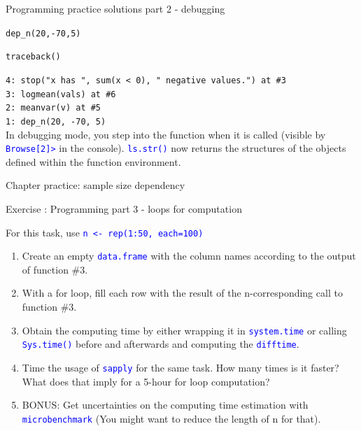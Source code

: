 \documentclass[xcolor=table,       handout,    xcolor=dvipsnames]{beamer}\usepackage[]{graphicx}\usepackage[]{color}
\makeatletter
\newcommand{\hlnum}[1]{\textcolor[rgb]{0,0,0}{#1}}
\newcommand{\hlopt}[1]{\textcolor[rgb]{0,0,0}{#1}}
\newcommand{\hlstd}[1]{\textcolor[rgb]{0,0,0}{#1}}
\newcommand{\hlkwd}[1]{\textcolor[rgb]{0,0,1}{#1}}
\newenvironment{kframe}{%
 \def\at@end@of@kframe{}%
 \ifinner\ifhmode%
  \def\at@end@of@kframe{\end{minipage}}%
  \begin{minipage}{\columnwidth}%
 \fi\fi%
 \def\FrameCommand##1{\hskip\@totalleftmargin \hskip-\fboxsep
 \colorbox{shadecolor}{##1}\hskip-\fboxsep
     \hskip-\linewidth \hskip-\@totalleftmargin \hskip\columnwidth}%
 \MakeFramed {\advance\hsize-\width
   \@totalleftmargin\z@ \linewidth\hsize
   \@setminipage}}%
 {\par\unskip\endMakeFramed%
 \at@end@of@kframe}
\newenvironment{knitrout}{}{} %
\newcounter{exercisecount}
\newenvironment{exercise}[1]
{%
\stepcounter{exercisecount}
\begin{block}{Exercise \arabic{exercisecount}: #1}
}
{%
\end{block} }
\newcommand{\rcode}[1]{\texttt{\textcolor{Blue}{#1}}} %
\makeatother
\begin{document}
\begin{frame}[fragile]{Programming practice solutions part 2 - debugging}
\begin{knitrout}
\color{fgcolor}\begin{kframe}
\begin{alltt}
\hlkwd{dep_n}\hlstd{(}\hlnum{20}\hlstd{,} \hlopt{-}\hlnum{70}\hlstd{,}\hlnum{5}\hlstd{)}
\end{alltt}


{\ttfamily\noindent\bfseries\color{errorcolor}{\#\# Error in logmean(vals): x has 20 negative values.}}\end{kframe}
\end{knitrout}
\begin{knitrout}
\color{fgcolor}\begin{kframe}
\begin{alltt}
\hlkwd{traceback}\hlstd{()}
\end{alltt}
\end{kframe}
\end{knitrout}
\texttt{4: stop("x has ", sum(x < 0), " negative values.") at \#3\\
3: logmean(vals) at \#6\\
2: meanvar(v) at \#5\\
1: dep\_n(20, -70, 5)}\\[1em]
In debugging mode, you step into the function when it is called (visible by \rcode{Browse[2]>} in the console). \rcode{ls.str()} now returns the structures of the objects defined within the function environment.
\end{frame}


\begin{frame}[fragile]{Chapter practice: sample size dependency}
\begin{exercise}{Programming part 3 - loops for computation}
For this task, use \rcode{n <- rep(1:50, each=100)}
\begin{enumerate}
\item Create an empty \rcode{data.frame} with the column names according to the output of function \#3.
\item With a for loop, fill each row with the result of the n-corresponding call to function \#3.
\item Obtain the computing time by either wrapping it in \rcode{system.time} or calling \rcode{Sys.time()} before and afterwards and computing the \rcode{difftime}.
\item Time the usage of \rcode{sapply} for the same task. How many times is it faster? What does that imply for a 5-hour for loop computation?
\item BONUS: Get uncertainties on the computing time estimation with \rcode{microbenchmark} (You might want to reduce the length of n for that).
\end{enumerate}
\end{exercise}
\end{frame}
\end{document}
